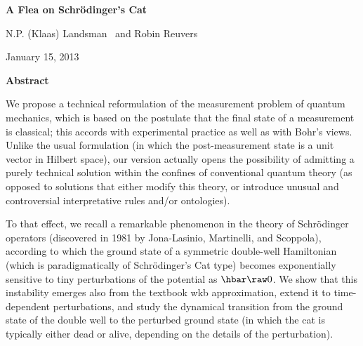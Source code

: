 \documentclass[12pt]{article}
\newcommand{\thedate}{January 15, 2013}
\begin{document}
 

 \setlength{\unitlength}{1cm}\cleardoublepage
\thispagestyle{empty}
\begin{center}
\Large{\bf A Flea on Schr\"{o}dinger's Cat}
\bigskip

\large{N.P. (Klaas)  Landsman   \,  and Robin Reuvers
}

\bigskip

\thedate

\bigskip

\smallskip

 \textbf{Abstract}
 \end{center}
  We propose a technical reformulation of the measurement problem of quantum mechanics, which is 
 based on the postulate that the final state of a measurement is classical; this accords with experimental practice as well as with  Bohr's views. 
   Unlike the usual formulation (in which the post-measurement state is a unit vector in Hilbert space),
   our version actually opens the possibility of admitting  a purely technical solution within the confines of conventional quantum theory (as opposed to solutions that either modify this theory, or introduce unusual and controversial interpretative rules and/or ontologies). 
   
To that effect, we recall  a remarkable phenomenon in the theory of Schr\"{o}dinger operators
(discovered in 1981 by Jona-Lasinio, Martinelli, and Scoppola),
according to which the ground state of a symmetric double-well  Hamiltonian (which is paradigmatically of Schr\"{o}dinger's Cat type) becomes exponentially sensitive to tiny perturbations of the potential as
$\hbar\raw 0$. We show that this instability
emerges also from the textbook  {\sc wkb} approximation, extend it to time-dependent perturbations, and study the dynamical transition from the ground state of the double well  to the perturbed ground state (in which the cat is typically either dead or alive, depending on the details of the perturbation). 
\end{document}

